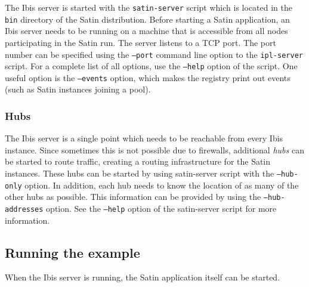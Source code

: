 \documentclass[a4paper,10pt]{article}
\begin{document}
The Ibis server is started with the \texttt{satin-server} script which is
located in the \texttt{bin} directory of the Satin distribution.  Before
starting a Satin application, an Ibis server needs to be running on a
machine that is accessible from all nodes participating in the Satin run.
The server listens to a TCP port. The port number can be specified using
the \texttt{--port} command line option to the \texttt{ipl-server}
script.  For a complete list of all options, use the \texttt{--help}
option of the script. One useful option is the  \texttt{--events}
option, which makes the registry print out events (such as Satin instances
joining a pool).

\subsubsection{Hubs}
\label{hubs}

The Ibis server is a single point which needs to be reachable from every
Ibis instance. Since sometimes this is not possible due to firewalls,
additional \emph{hubs} can be started to route traffic, creating a
routing infrastructure for the Satin instances. These hubs can be started
by using satin-server script with the \texttt{--hub-only} option. In
addition, each hub needs to know the location of as many of the other
hubs as possible. This information can be provided by using the
\texttt{--hub-addresses} option. See the \texttt{--help} option of the
satin-server script for more information.

\subsection{Running the example}

When the Ibis server is running, the Satin application itself can be
started. 
\end{document}
